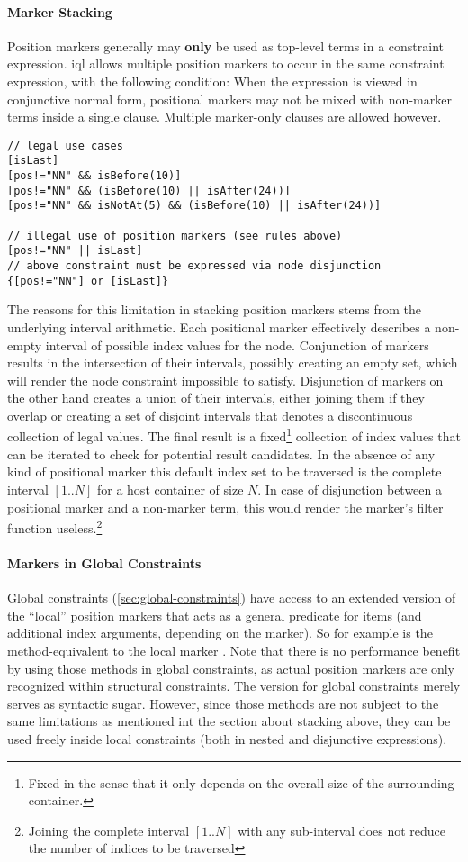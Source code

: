 \documentclass[11pt,a4paper]{article}
\begin{document}
\paragraph{Marker Stacking}
\noindent Position markers generally may \textbf{only} be used as top-level terms in a constraint expression.
\ac{iql} allows multiple position markers to occur in the same constraint expression, with the following condition:
When the expression is viewed in conjunctive normal form, positional markers may not be mixed with non-marker terms inside a single clause.
Multiple marker-only clauses are allowed however.
\begin{Verbatim}[samepage=true]
// legal use cases
[isLast]
[pos!="NN" && isBefore(10)]
[pos!="NN" && (isBefore(10) || isAfter(24))]
[pos!="NN" && isNotAt(5) && (isBefore(10) || isAfter(24))]

// illegal use of position markers (see rules above)
[pos!="NN" || isLast]
// above constraint must be expressed via node disjunction
{[pos!="NN"] or [isLast]}
\end{Verbatim}
The reasons for this limitation in stacking position markers stems from the underlying interval arithmetic.
Each positional marker effectively describes a non-empty interval of possible index values for the node.
Conjunction of markers results in the intersection of their intervals, possibly creating an empty set, which will render the node constraint impossible to satisfy.
Disjunction of markers on the other hand creates a union of their intervals, either joining them if they overlap or creating a set of disjoint intervals that denotes a discontinuous collection of legal values.
The final result is a fixed\footnote{Fixed in the sense that it only depends on the overall size of the surrounding container.} collection of index values that can be iterated to check for potential result candidates.
In the absence of any kind of positional marker this default index set to be traversed is the complete interval $[1..N]$ for a host container of size $N$.
In case of disjunction between a positional marker and a non-marker term, this would render the marker's filter function useless.\footnote{Joining the complete interval $[1..N]$ with any sub-interval does not reduce the number of indices to be traversed}

\paragraph{Markers in Global Constraints}
\noindent Global constraints (\ref{sec:global-constraints}) have access to an extended version of the ``local'' position markers that acts as a general predicate for items (and additional index arguments, depending on the marker).
So for example  is the method-equivalent to the local marker \query{[\$x: isLast]}.
Note that there is no performance benefit by using those methods in global constraints, as actual position markers are only recognized within structural constraints.
The version for global constraints merely serves as syntactic sugar.
However, since those methods are not subject to the same limitations as mentioned int the section about stacking above, they can be used freely inside local constraints (both in nested and disjunctive expressions).
\end{document}
